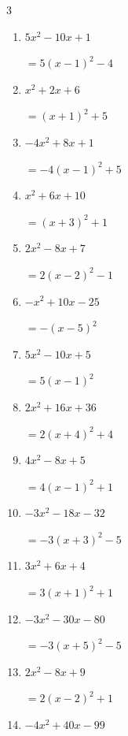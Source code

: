 \begin{multicols}{3}
\begin{enumerate}
        $=4\left( x-5\right)^{2}-3$

\columnbreak %

  \item $5x^{2}-10x+1$

        $=5\left( x-1\right)^{2}-4$

  \item $x^{2}+2x+6$

        $=\left( x+1\right)^{2}+5$

  \item $-4x^{2}+8x+1$

        $=-4\left( x-1\right)^{2}+5$

  \item $x^{2}+6x+10$

        $=\left( x+3\right)^{2}+1$

  \item $2x^{2}-8x+7$

        $=2\left( x-2\right)^{2}-1$

  \item $-x^{2}+10x-25$

        $=-\left( x-5\right)^{2}$

  \item $5x^{2}-10x+5$

        $=5\left( x-1\right)^{2}$

  \item $2x^{2}+16x+36$

        $=2\left( x+4\right)^{2}+4$

  \item $4x^{2}-8x+5$

        $=4\left( x-1\right)^{2}+1$

  \item $-3x^{2}-18x-32$

        $=-3\left( x+3\right)^{2}-5$

\columnbreak %

  \item $3x^{2}+6x+4$

        $=3\left( x+1\right)^{2}+1$

  \item $-3x^{2}-30x-80$

        $=-3\left( x+5\right)^{2}-5$

  \item $2x^{2}-8x+9$

        $=2\left( x-2\right)^{2}+1$

  \item $-4x^{2}+40x-99$


\end{enumerate}
\end{multicols}
